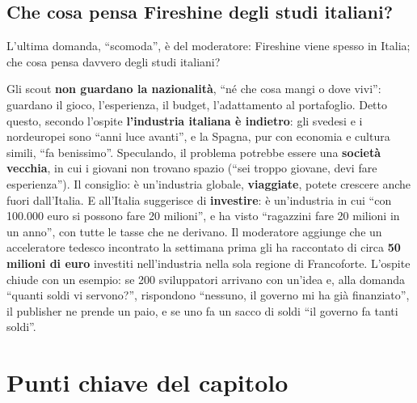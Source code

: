 \subsection{Che cosa pensa Fireshine degli studi italiani?}

L'ultima domanda, ``scomoda'', è del moderatore: Fireshine viene spesso in Italia;
che cosa pensa davvero degli studi italiani?

Gli scout \textbf{non guardano la nazionalità}, ``né che cosa mangi o dove vivi'':
guardano il gioco, l'esperienza, il budget, l'adattamento al portafoglio. Detto
questo, secondo l'ospite \textbf{l'industria italiana è indietro}: gli svedesi e
i nordeuropei sono ``anni luce avanti'', e la Spagna, pur con economia e cultura
simili, ``fa benissimo''. Speculando, il problema potrebbe essere una
\textbf{società vecchia}, in cui i giovani non trovano spazio (``sei troppo
giovane, devi fare esperienza''). Il consiglio: è un'industria globale,
\textbf{viaggiate}, potete crescere anche fuori dall'Italia. E all'Italia
suggerisce di \textbf{investire}: è un'industria in cui ``con 100.000 euro si
possono fare 20 milioni'', e ha visto ``ragazzini fare 20 milioni in un anno'', con
tutte le tasse che ne derivano. Il moderatore aggiunge che un acceleratore tedesco
incontrato la settimana prima gli ha raccontato di circa \textbf{50 milioni di
euro} investiti nell'industria nella sola regione di Francoforte. L'ospite chiude
con un esempio: se 200 sviluppatori arrivano con un'idea e, alla domanda ``quanti
soldi vi servono?'', rispondono ``nessuno, il governo mi ha già finanziato'', il
publisher ne prende un paio, e se uno fa un sacco di soldi ``il governo fa tanti
soldi''.

\section*{Punti chiave del capitolo}

